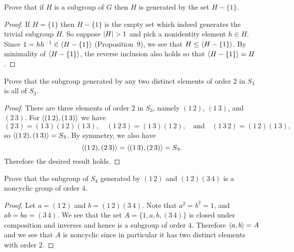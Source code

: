  Prove that if $H$ is a subgroup of $G$ then $H$ is
generated by the set $H - \{1\}$.
\begin{proof}
  If $H = \{1\}$ then $H - \{1\}$ is the empty set which indeed
  generates the trivial subgroup $H$. So suppose $\lvert{H}\rvert > 1$ and
  pick a nonidentity element $h\in H$. Since
  $1 = hh^{-1}\in\langle{H - \{1\}}\rangle$ (Proposition~9), we see that
  $H\leq\langle{H - \{1\}}\rangle$. By minimality of $\langle{H - \{1\}}\rangle$, the
  reverse inclusion also holds so that $\langle{H - \{1\}}\rangle = H$.
\end{proof}

 Prove that the subgroup generated by any two distinct
elements of order $2$ in $S_3$ is all of $S_3$.
\begin{proof}
  There are three elements of order $2$ in $S_3$, namely $(1\,2)$,
  $(1\,3)$, and $(2\,3)$. For $\langle{(1\,2), (1\,3)}\rangle$ we have
  \begin{equation*}
    (2\,3) = (1\,3)(1\,2)(1\,3),
    \quad
    (1\,2\,3) = (1\,3)(1\,2),
    \quad\text{and}\quad
    (1\,3\,2) = (1\,2)(1\,3),
  \end{equation*}
  so $\langle{(1\,2), (1\,3)}\rangle = S_3$. By symmetry, we also have
  \begin{equation*}
    \langle{(1\,2), (2\,3)}\rangle = \langle{(1\,3), (2\,3)}\rangle = S_3.
  \end{equation*}
  Therefore the desired result holds.
\end{proof}

 Prove that the subgroup of $S_4$ generated by $(1\,2)$ and
$(1\,2)(3\,4)$ is a noncyclic group of order $4$.
\begin{proof}
  Let $a = (1\,2)$ and $b = (1\,2)(3\,4)$. Note that $a^2 = b^2 = 1$,
  and $ab = ba = (3\,4)$. We see that the set
  $A = \{1, a, b, (3\,4)\}$ is closed under composition and inverses
  and hence is a subgroup of order $4$. Therefore $\langle{a, b}\rangle = A$ and
  we see that $A$ is noncyclic since in particular it has two distinct
  elements with order $2$.
\end{proof}

